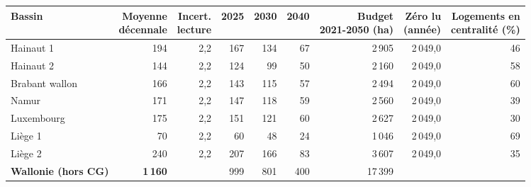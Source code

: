 \begin{tabular}{lrrrrrrrr}
\toprule
Bassin & \makecell{Moyenne\\décennale} & \makecell{Incert.\\lecture} & 2025 & 2030 & 2040 & \makecell{Budget\\2021-2050 (ha)} & \makecell{Zéro lu\\(année)} & \makecell{Logements en\\centralité (\%)} \\
\midrule
Hainaut 1 & 194 & 2{,}2 & 167 & 134 & 67 & 2\,905 & 2\,049{,}0 & 46 \\
Hainaut 2 & 144 & 2{,}2 & 124 & 99 & 50 & 2\,160 & 2\,049{,}0 & 58 \\
Brabant wallon & 166 & 2{,}2 & 143 & 115 & 57 & 2\,494 & 2\,049{,}0 & 60 \\
Namur & 171 & 2{,}2 & 147 & 118 & 59 & 2\,560 & 2\,049{,}0 & 39 \\
Luxembourg & 175 & 2{,}2 & 151 & 121 & 60 & 2\,627 & 2\,049{,}0 & 30 \\
Liège 1 & 70 & 2{,}2 & 60 & 48 & 24 & 1\,046 & 2\,049{,}0 & 69 \\
Liège 2 & 240 & 2{,}2 & 207 & 166 & 83 & 3\,607 & 2\,049{,}0 & 35 \\
\midrule
\textbf{Wallonie (hors CG)} & \textbf{1\,160} & & 999 & 801 & 400 & 17\,399 & &  \\
\bottomrule
\end{tabular}
